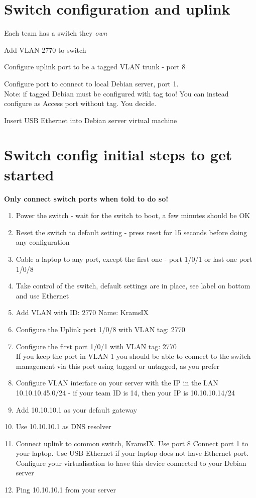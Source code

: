 \documentclass[a4paper,11pt,notitlepage]{report}
\begin{document}
\section*{Switch configuration and uplink}

Each team has a switch they \emph{own}
\begin{list2}
\item Add VLAN 2770 to switch
\item Configure uplink port to be a tagged VLAN trunk - port 8
\item Configure port to connect to local Debian server, port 1.\\ Note: if tagged Debian must be configured with tag too! You can instead configure as Access port without tag. You decide.
\item Insert USB Ethernet into Debian server virtual machine
\end{list2}

\eject
\section*{Switch config initial steps to get started}

{\bf Only connect switch ports when told to do so!}

\begin{enumerate}
\item Power the switch - wait for the switch to boot, a few minutes should be OK
\item Reset the switch to default setting - press reset for 15 seconds before doing any configuration
\item Cable a laptop to any port, except the first one - port 1/0/1 or last one port 1/0/8
\item Take control of the switch, default settings are in place, see label on bottom and use Ethernet
\item Add VLAN with ID: 2770 Name: KramsIX

\item Configure the Uplink port 1/0/8 with VLAN tag: 2770
\item Configure the first port 1/0/1 with VLAN tag: 2770\\
If you keep the port in VLAN 1 you should be able to connect to the switch management via this port using tagged or untagged, as you prefer \smiley
\item Configure VLAN interface on your server with the IP in the LAN 10.10.10.45.0/24 - if your team ID is 14, then your IP is 10.10.10.14/24
\item Add 10.10.10.1 as your default gateway
\item Use 10.10.10.1 as DNS resolver

\vskip 2cm
\item Connect uplink to common switch, KramsIX. Use port 8
Connect port 1 to your laptop. Use USB Ethernet if your laptop does not have Ethernet port. Configure your virtualisation to have this device connected to your Debian server
\item Ping 10.10.10.1 from your server
\end{enumerate}
\end{document}
